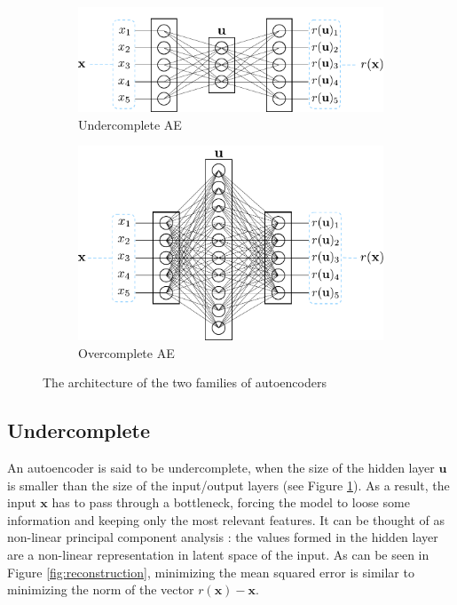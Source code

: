 \begin{figure}[!h]
\centering
\begin{subfigure}{.5\textwidth}
\vspace*{12mm}
  \centering
  \includegraphics[width=.95\linewidth]{figures/autoencoder-undercomplete}
  \vspace*{8mm}
  \caption{Undercomplete AE}
  \label{fig:undercomplete-ae}
\end{subfigure}%
\begin{subfigure}{.5\textwidth}
  \centering
  \includegraphics[width=.95\linewidth]{figures/autoencoder-overcomplete}
  \caption{Overcomplete AE}
  \label{fig:overcomplete-ae}
\end{subfigure}
\caption{The architecture of the two families of autoencoders}
\label{fig:under-over-ae}
\end{figure}

\subsection*{Undercomplete}
An autoencoder is said to be undercomplete, when the size of the hidden layer $\mathbf{u}$ is smaller than the size of the input/output layers (see Figure \ref{fig:undercomplete-ae}). As a result, the input $\mathbf{x}$ has to pass through a bottleneck, forcing the model to loose some information and keeping only the most relevant features. It can be thought of as non-linear principal component analysis \citep{pca-ae-1, pca-ae-2}: the values formed in the hidden layer are a non-linear representation in latent space of the input. As can be seen in Figure \ref{fig:reconstruction}, minimizing the mean squared error is similar to minimizing the norm of the vector $r(\mathbf{x}) - \mathbf{x}$.


